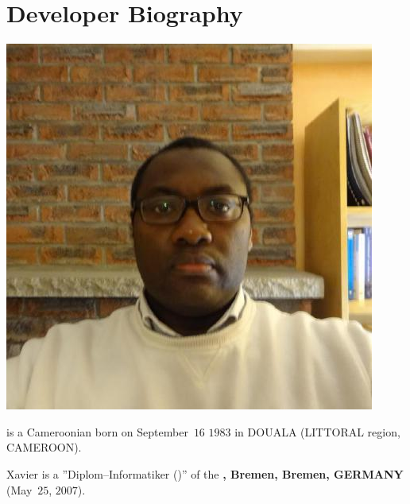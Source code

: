 \section{Developer Biography}\label{chap:biography}
\vspace{-0.9em}

\begin{center}
\includegraphics[scale=0.32]{../../francais/images/XavierNOUNDOU-2}
\end{center}

\textbf{\myfullacademicname} is a Cameroonian
born on September~$16$ $1983$ in DOUALA (LITTORAL region, CAMEROON).

Xavier is a ''Diplom--Informatiker (\diplinf)'' of
the \textbf{\unibremen, Bremen, Bremen, GERMANY} (May~$25$, $2007$).